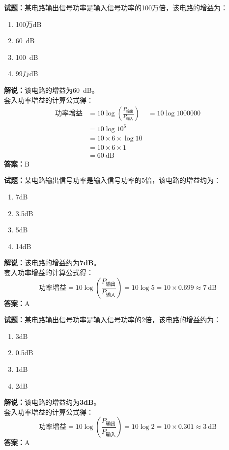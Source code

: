 \documentclass{ctexbook}
\begin{document}
\textbf{试题：}某电路输出信号功率是输入信号功率的100万倍，该电路的增益为：
\begin{enumerate}[leftmargin=3em]
  \item \num{100}万\si{\dB}
  \item \SI{60}{\dB}
  \item \SI{100}{\dB}
  \item \num{99}万\si{\dB}
\end{enumerate}
\noindent\textbf{解说：}该电路的增益为\SI{60}{\dB}。\\
套入功率增益的计算公式得：
\begin{equation*}
  \begin{aligned}
    \mbox{功率增益} & =10 \log \left( {\frac{P_{ \mbox{输出} }}{P_{ \mbox{输入} }}} \right)
                & = 10 \log 1000000                                                 \\
                & = 10 \log 10^6                                                    \\
                & = 10\times 6\times \log 10                                        \\
                & = 10\times 6\times 1                                              \\
                & = \SI{60}{\dB}
  \end{aligned}
\end{equation*}
\noindent\textbf{答案：}B

\vspace{1em}

\textbf{试题：}某电路输出信号功率是输入信号功率的5倍，该电路的增益约为：
\begin{enumerate}[leftmargin=3em]
  \item 7dB
  \item 3.5dB
  \item 5dB
  \item 14dB
\end{enumerate}
\noindent\textbf{解说：}该电路的增益约为\textbf{7dB}。\\
套入功率增益的计算公式得：
$$\mbox{功率增益}=10 \log \left( {\frac{P_{ \mbox{输出} }}{P_{ \mbox{输入} }}} \right)=10 \log 5 = 10 \times 0.699 \approx 7 \ \mathrm{dB}$$
\noindent\textbf{答案：}A

\vspace{1em}

\textbf{试题：}某电路输出信号功率是输入信号功率的2倍，该电路的增益约为：
\begin{enumerate}[leftmargin=3em]
  \item 3dB
  \item 0.5dB
  \item 1dB
  \item 2dB
\end{enumerate}
\noindent\textbf{解说：}该电路的增益约为\textbf{3dB}。\\
套入功率增益的计算公式得：
$$\mbox{功率增益}=10 \log \left( {\frac{P_{ \mbox{输出} }}{P_{ \mbox{输入} }}} \right)=10 \log 2 = 10 \times 0.301 \approx 3 \ \mathrm{dB}$$
\noindent\textbf{答案：}A
\end{document}
